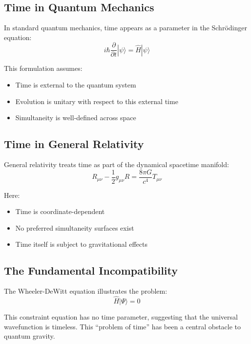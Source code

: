 \documentclass[12pt,a4paper]{article}
\begin{document}
\subsection{Time in Quantum Mechanics}

In standard quantum mechanics, time appears as a parameter in the Schrödinger equation:
\begin{equation}
i\hbar \frac{\partial}{\partial t} |\psi\rangle = \hat{H} |\psi\rangle
\end{equation}

This formulation assumes:
\begin{itemize}
\item Time is external to the quantum system
\item Evolution is unitary with respect to this external time
\item Simultaneity is well-defined across space
\end{itemize}

\subsection{Time in General Relativity}

General relativity treats time as part of the dynamical spacetime manifold:
\begin{equation}
R_{\mu\nu} - \frac{1}{2}g_{\mu\nu}R = \frac{8\pi G}{c^4}T_{\mu\nu}
\end{equation}

Here:
\begin{itemize}
\item Time is coordinate-dependent
\item No preferred simultaneity surfaces exist
\item Time itself is subject to gravitational effects
\end{itemize}

\subsection{The Fundamental Incompatibility}

The Wheeler-DeWitt equation illustrates the problem:
\begin{equation}
\hat{H}|\Psi\rangle = 0
\end{equation}

This constraint equation has no time parameter, suggesting that the universal wavefunction is timeless. This ``problem of time'' has been a central obstacle to quantum gravity.
\end{document}
